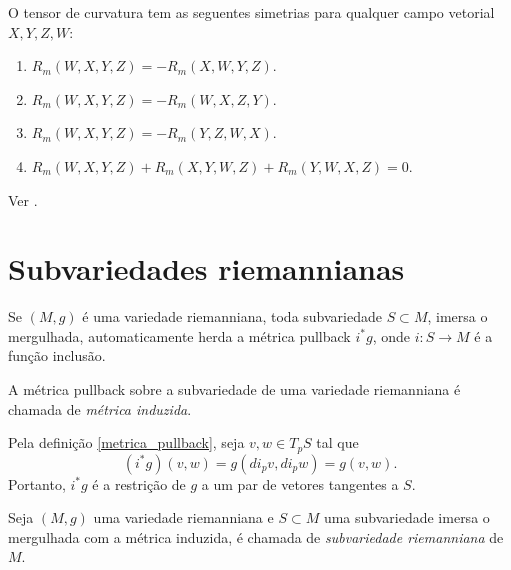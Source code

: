 \begin{proposicao}\label{simetrias-del-tensor-de-curvatura}
	O tensor de curvatura tem as seguentes simetrias para qualquer campo vetorial $X,Y,Z,W$:
	\begin{enumerate}
		\item $R_m(W,X,Y,Z) = -R_m(X,W,Y,Z)$.
		\item $R_m(W,X,Y,Z) = -R_m(W,X,Z,Y)$.
		\item $R_m(W,X,Y,Z) = -R_m(Y,Z,W,X)$.
		\item $R_m(W,X,Y,Z) + R_m(X,Y,W,Z) + R_m(Y,W,X,Z) = 0$.
	\end{enumerate}
\end{proposicao}

\begin{demonstracao}
	Ver \cite[Proposition 7.4]{Lee1997}.
\end{demonstracao}








\section{Subvariedades riemannianas}



\begin{observacao}
	Se $(M,g)$ é uma variedade riemanniana, toda subvariedade $S \subset M$, imersa o mergulhada, automaticamente herda a métrica pullback $i^* g$, onde $i: S \rightarrow M$ é a função inclusão.
\end{observacao}

\begin{definicao}\label{metrica_induzida}
	A métrica pullback sobre a subvariedade de uma variedade riemanniana é chamada de \emph{métrica induzida}.
\end{definicao}

\begin{observacao}
	Pela definição \ref{metrica_pullback}, seja $v,w \in T_p S$ tal que
	\begin{equation*}
	(i^* g)(v,w) = g(di_p v, di_p w) = g(v,w). 
	\end{equation*}
	Portanto, $i^* g$ é a restrição de $g$ a um par de vetores tangentes a $S$. 
\end{observacao}



\begin{definicao}
	Seja $(M,g)$ uma variedade riemanniana e $S \subset M$ uma subvariedade imersa o mergulhada com a métrica induzida, é chamada de \emph{subvariedade riemanniana} de $M$.
\end{definicao}


